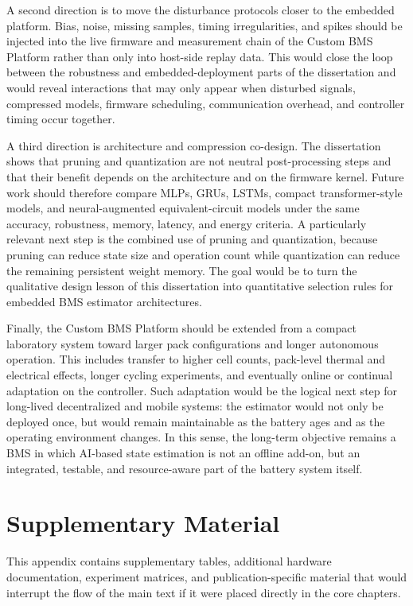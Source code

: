 \documentclass[
    a4paper,
    12pt,
    titlepage,
    bibliography=totoc,
    twoside=on,
    parskip=false,
    numbers=noenddot,
    cleardoublepage=empty,
    DIV=12,
    BCOR=12.0mm,
    headheight=36pt,
    headings=openright
]{scrreprt}
\begin{document}
A second direction is to move the disturbance protocols closer to the embedded platform. Bias, noise, missing samples, timing irregularities, and spikes should be injected into the live firmware and measurement chain of the Custom BMS Platform rather than only into host-side replay data. This would close the loop between the robustness and embedded-deployment parts of the dissertation and would reveal interactions that may only appear when disturbed signals, compressed models, firmware scheduling, communication overhead, and controller timing occur together.

A third direction is architecture and compression co-design. The dissertation shows that pruning and quantization are not neutral post-processing steps and that their benefit depends on the architecture and on the firmware kernel. Future work should therefore compare MLPs, GRUs, LSTMs, compact transformer-style models, and neural-augmented equivalent-circuit models under the same accuracy, robustness, memory, latency, and energy criteria. A particularly relevant next step is the combined use of pruning and quantization, because pruning can reduce state size and operation count while quantization can reduce the remaining persistent weight memory. The goal would be to turn the qualitative design lesson of this dissertation into quantitative selection rules for embedded BMS estimator architectures.

Finally, the Custom BMS Platform should be extended from a compact laboratory system toward larger pack configurations and longer autonomous operation. This includes transfer to higher cell counts, pack-level thermal and electrical effects, longer cycling experiments, and eventually online or continual adaptation on the controller. Such adaptation would be the logical next step for long-lived decentralized and mobile systems: the estimator would not only be deployed once, but would remain maintainable as the battery ages and as the operating environment changes. In this sense, the long-term objective remains a BMS in which AI-based state estimation is not an offline add-on, but an integrated, testable, and resource-aware part of the battery system itself.

\printbibliography

\appendix
\chapter{Supplementary Material}
This appendix contains supplementary tables, additional hardware documentation, experiment matrices, and publication-specific material that would interrupt the flow of the main text if it were placed directly in the core chapters.
\end{document}

